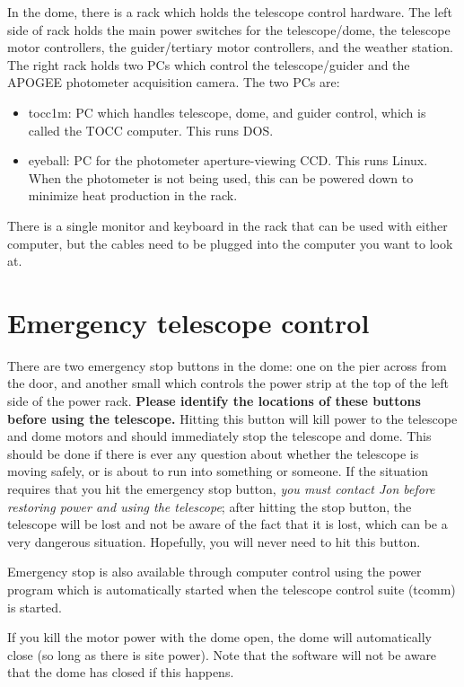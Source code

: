 \documentclass[10pt]{report}
\begin{document}
In the dome, there is a rack which holds the telescope control
hardware. The left side of rack holds the main power switches for
the telescope/dome, the telescope motor controllers, the guider/tertiary
motor controllers, and the weather station.  The right rack holds
two PCs which control the telescope/guider and the APOGEE photometer
acquisition camera. The two PCs are:

\begin{itemize}
\item tocc1m: PC which handles telescope, dome, and guider control, which 
is called the TOCC computer.  This runs DOS.

\item eyeball: PC for the photometer aperture-viewing CCD. This runs Linux.
When the photometer is not being used, this can be powered down to 
minimize heat production in the rack.

\end{itemize}

There is a single monitor and keyboard in the rack that can be used with
either computer, but the cables need to be plugged into the computer
you want to look at.

\section{Emergency telescope control}

There are two emergency stop buttons in the dome: one on the pier across
from the door, and another small which controls the power strip at the top 
of the left side of the power rack.
\textbf{Please identify the locations of these buttons before using
the telescope.}
Hitting this button will kill power to the telescope and dome motors and
should immediately stop the telescope and dome.  This should
be done if there is ever any question about whether the telescope is
moving safely, or is about to run into something or someone.
If the situation requires that you hit the emergency
stop button, \textit{you must contact Jon before restoring power and
using the telescope}; after hitting the stop button, the telescope will
be lost and not be aware of the fact that it is lost, which can be a
very dangerous situation. Hopefully, you will never need to hit this
button.

Emergency stop is also available through computer control using the
power program which is automatically started when the telescope control
suite (tcomm) is started.

If you kill the motor power with the dome open, the dome will automatically 
close (so long as there is site power). Note that the software will not be 
aware that the dome has closed if this
happens.
\end{document}
